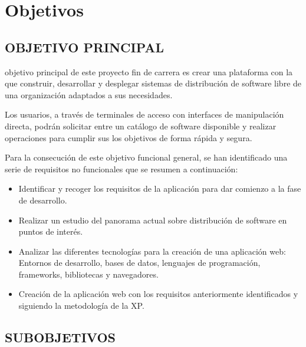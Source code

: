 \cleardoublepage
\chapter{Objetivos}
\thispagestyle{fancy}

\section{\uppercase{Objetivo principal}}

 objetivo principal de este proyecto fin de carrera es crear una
plataforma con la que construir, desarrollar y desplegar sistemas de
distribución de software libre de una organización adaptados a sus 
necesidades.

Los usuarios, a través de terminales de acceso con interfaces de manipulación
directa, podrán solicitar entre un catálogo de software disponible y realizar
operaciones para cumplir sus los objetivos de forma rápida y
segura.

Para la consecución de este objetivo funcional general, se han identificado una
serie de requisitos no funcionales que se resumen a continuación:

\begin{itemize}
    \item{Identificar y recoger los requisitos de la aplicación para dar
    comienzo a la fase de desarrollo.}
    \item{Realizar un estudio del panorama actual sobre distribución de software en
    puntos de interés.}
    \item{Analizar las diferentes tecnologías para la creación de una aplicación web:
    Entornos de desarrollo, bases de datos, lenguajes de programación,
    frameworks, bibliotecas y navegadores.}
    \item{Creación de la aplicación web con los requisitos anteriormente
    identificados y siguiendo la metodología de la XP.}
\end{itemize}

\newpage

\section{\uppercase{Subobjetivos}}

